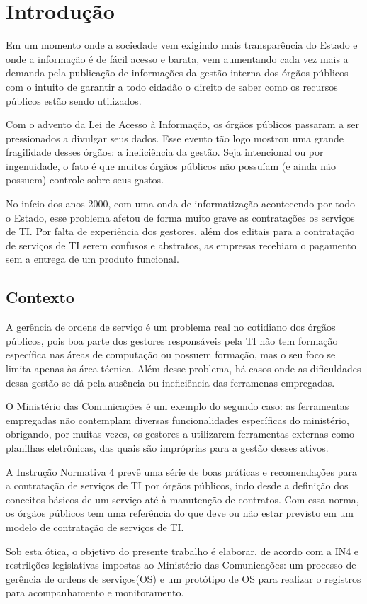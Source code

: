 \section{Introdução}

Em um momento onde a sociedade vem exigindo mais transparência do Estado e onde
a informação é de fácil acesso e barata, vem aumentando cada vez mais a demanda
pela publicação de informações da gestão interna dos órgãos públicos com o
intuito de garantir a todo cidadão o direito de saber como os recursos públicos
estão sendo utilizados.

Com o advento da Lei de Acesso à Informação, os órgãos públicos passaram a ser
pressionados a divulgar seus dados. Esse evento tão logo mostrou uma grande
fragilidade desses órgãos: a ineficiência da gestão. Seja intencional ou por
ingenuidade, o fato é que muitos órgãos públicos não possuíam (e ainda não
possuem) controle sobre seus gastos.

No início dos anos 2000, com uma onda de informatização acontecendo por todo o
Estado, esse problema afetou de forma muito grave as contratações os serviços
de TI. Por falta de experiência dos gestores, além dos editais para a
contratação de serviços de TI serem confusos e abstratos, as empresas recebiam
o pagamento sem a entrega de um produto funcional.

\subsection{Contexto}

A gerência de ordens de serviço é um problema real no cotidiano dos órgãos
públicos, pois boa parte dos gestores responsáveis pela TI não tem formação específica
nas áreas de computação ou possuem formação, mas o seu foco se limita
apenas às área técnica. Além desse problema, há casos onde as dificuldades
dessa gestão se dá pela ausência ou ineficiência das ferramenas empregadas.

O Ministério das Comunicações é um exemplo do segundo caso: as ferramentas 
empregadas não contemplam diversas funcionalidades específicas do ministério,
obrigando, por muitas vezes, os gestores a utilizarem ferramentas externas como
planilhas eletrônicas, das quais são impróprias para a gestão desses ativos.

A Instrução Normativa 4 prevê uma série de boas práticas e recomendações para
a contratação de serviços de TI por órgãos públicos, indo desde a definição
dos conceitos básicos de um serviço até à manutenção de contratos. Com essa
norma, os órgãos públicos tem uma referência do que deve ou não estar previsto
em um modelo de contratação de serviços de TI.

Sob esta ótica, o objetivo do presente trabalho é elaborar, de acordo com a
IN4 e restrilções legislativas impostas ao Ministério das Comunicações: um 
processo de gerência de ordens de serviços(OS) e um protótipo de OS para
realizar o registros para acompanhamento e monitoramento.
